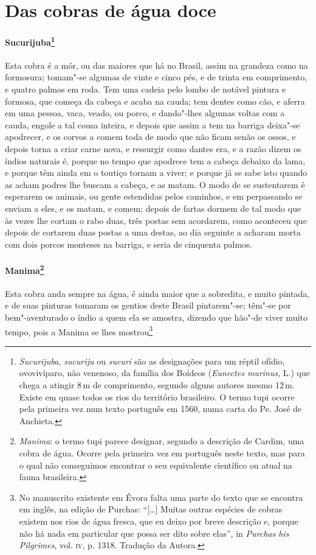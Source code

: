 \section{Das cobras de água doce}
\paragraph{Sucurijuba\footnote{ \textit{Sucurijuba, sucuriju}
ou \textit{sucuri} são as designações para um réptil ofídio,
ovovivíparo, não venenoso, da família dos Boídeos (\textit{Eunectes
murinus}, L.) que chega a atingir 8\,m de comprimento, segundo alguns
autores mesmo 12\,m. Existe em quase todos os rios do território
brasileiro. O termo tupi ocorre pela primeira vez num texto português
em 1560, numa carta do Pe. José de Anchieta.}} Esta
cobra é a mór, ou das maiores que há no Brasil, assim na grandeza como
na formosura; tomam"-se algumas de vinte e cinco pés, e de trinta em
comprimento, e quatro palmos em roda. Tem uma cadeia pelo lombo de
notável pintura e formosa, que começa da cabeça e acaba na cauda; tem
dentes como cão, e aferra em uma pessoa, vaca, veado, ou porco, e
dando"-lhes algumas voltas com a cauda, engole a tal cousa inteira, e
depois que assim a tem na barriga deixa"-se apodrecer, e os corvos a
comem toda de modo que não ficam senão os ossos, e depois torna a criar
carne nova, e ressurgir como dantes era, e a razão dizem os índios
naturais é, porque no tempo que apodrece tem a cabeça debaixo da lama,
e porque têm ainda em o toutiço tornam a viver; e porque já se sabe
isto quando as acham podres lhe buscam a cabeça, e as matam. O modo de
se sustentarem é esperarem os animais, ou gente estendidas pelos
caminhos, e em perpassando se enviam a eles, e os matam, e comem;
depois de fartas dormem de tal modo que às vezes lhe cortam o rabo
duas, três postas sem acordarem, como aconteceu que depois de cortarem
duas postas a uma destas, ao dia seguinte a acharam morta com dois
porcos monteses na barriga, e seria de cinquenta palmos.

\paragraph{Manima\footnote{ \textit{Manima}: o termo tupi parece
designar, segundo a descrição de Cardim, uma cobra de água. Ocorre pela
primeira vez em português neste texto, mas para o qual não conseguimos
encontrar o seu equivalente científico ou atual na fauna
brasileira.}} Esta cobra anda sempre na água, é ainda maior
que a sobredita, e muito pintada, e de suas pinturas tomaram os gentios
deste Brasil pintarem"-se; têm"-se por bem"-aventurado o índio a quem ela
se amostra, dizendo que hão"-de viver muito tempo, pois a Manima se lhes
mostrou\footnote{ No manuscrito existente em Évora falta uma parte
do texto que se encontra em inglês, na edição de Purchas: ``[\ldots{}] 
Muitas outras espécies de cobras existem nos rios de água fresca, que
eu deixo por breve descrição e, porque não há nada em particular que
possa ser dito sobre elas'', in \textit{Purchas his Pilgrimes}, vol.
\textsc{iv}, p. 1318. Tradução da Autora.} 


